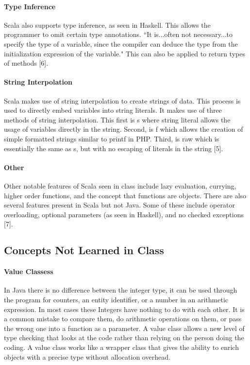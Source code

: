 \documentclass[12pt]{article}
\begin{document}
		\paragraph{Type Inference}Scala also supports type inference, as seen in Haskell. This allows the programmer to omit certain type annotations. ``It is...often not necessary...to specify the type of a variable, since the compiler can deduce the type from the initialization expression of the variable." This can also be applied to return types of methods [6].
		\paragraph{String Interpolation} Scala makes use of string interpolation to create strings of data. This process is used to directly embed variables into string literals. It makes use of three methods of string interpolation. This first is s where string literal allows the usage of variables directly in the string. Second, is f which allows the creation of simple formatted strings similar to printf in PHP. Third, is raw which is essentially the same as s, but with no escaping of literals in the string [5].
		\paragraph{Other}Other notable features of Scala seen in class include lazy evaluation, currying, higher order functions, and the concept that functions are objects. There are also several features present in Scala but not Java. Some of these include operator overloading, optional parameters (as seen in Haskell), and no checked exceptions [7].
	\subsection{Concepts Not Learned in Class}
		\paragraph{Value Classess} In Java there is no difference between the integer type, it can be used through the program for counters, an entity identifier, or a number in an arithmetic expression. In most cases these Integers have nothing to do with each other. It is a common mistake to compare them, do arithmetic operations on them, or pass the wrong one into a function as a parameter. A value class allows a new level of type checking that looks at the code rather than relying on the person doing the coding. A value class works like a wrapper class that gives the ability to enrich objects with a precise type without allocation overhead. 
\end{document}
